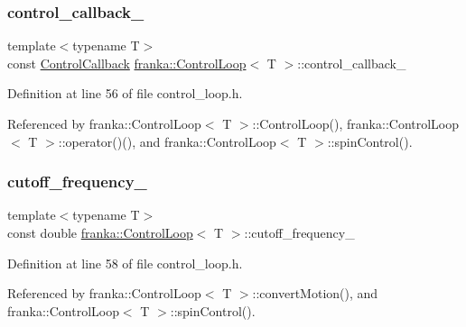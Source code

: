\subsubsection{\texorpdfstring{control\+\_\+callback\+\_\+}{control\_callback\_}}
{\footnotesize\ttfamily template$<$typename T$>$ \\
const \hyperlink{classfranka_1_1ControlLoop_a1b050245c6f2795d491899440f95cec3}{Control\+Callback} \hyperlink{classfranka_1_1ControlLoop}{franka\+::\+Control\+Loop}$<$ T $>$\+::control\+\_\+callback\+\_\+\hspace{0.3cm}{\ttfamily [private]}}



Definition at line 56 of file control\+\_\+loop.\+h.



Referenced by franka\+::\+Control\+Loop$<$ T $>$\+::\+Control\+Loop(), franka\+::\+Control\+Loop$<$ T $>$\+::operator()(), and franka\+::\+Control\+Loop$<$ T $>$\+::spin\+Control().

\mbox{\label{classfranka_1_1ControlLoop_a1c01098536341d3e1da2617a08129529}} 
\subsubsection{\texorpdfstring{cutoff\+\_\+frequency\+\_\+}{cutoff\_frequency\_}}
{\footnotesize\ttfamily template$<$typename T$>$ \\
const double \hyperlink{classfranka_1_1ControlLoop}{franka\+::\+Control\+Loop}$<$ T $>$\+::cutoff\+\_\+frequency\+\_\+\hspace{0.3cm}{\ttfamily [private]}}



Definition at line 58 of file control\+\_\+loop.\+h.



Referenced by franka\+::\+Control\+Loop$<$ T $>$\+::convert\+Motion(), and franka\+::\+Control\+Loop$<$ T $>$\+::spin\+Control().

\mbox{\label{classfranka_1_1ControlLoop_a935eeb4a950ed2276e5c00d26e9c5a16}} 
